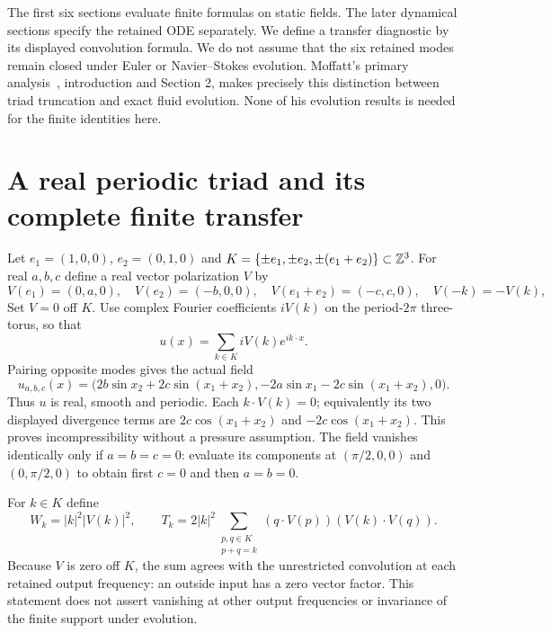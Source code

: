 \documentclass[11pt]{article}
\begin{document}
The first six sections evaluate finite formulas on static fields. The later dynamical sections specify the retained ODE separately. We define a transfer
diagnostic by its displayed convolution formula. We do not assume that
the six retained modes remain closed under Euler or Navier--Stokes
evolution. Moffatt's primary analysis~\cite{moffatt}, introduction and
Section 2, makes precisely this distinction between triad truncation and
exact fluid evolution. None of his evolution results is needed for the
finite identities here.

\section{A real periodic triad and its complete finite transfer}
Let $e_1=(1,0,0)$, $e_2=(0,1,0)$ and
$K=\{\pm e_1,\pm e_2,\pm(e_1+e_2)\}\subset\mathbb Z^3$.
For real $a,b,c$ define a real vector polarization $V$ by
\[
 V(e_1)=(0,a,0),\quad V(e_2)=(-b,0,0),\quad
 V(e_1+e_2)=(-c,c,0),\quad V(-k)=-V(k),
\]
Set $V=0$ off $K$. Use complex Fourier coefficients $iV(k)$ on
the period-$2\pi$ three-torus, so that
\[u(x)=\sum_{k\in K}iV(k)e^{ik\cdot x}.\] Pairing opposite modes gives the actual field
\begin{equation}\label{eq:velocity}
 u_{a,b,c}(x)=\bigl(2b\sin x_2+2c\sin(x_1+x_2),
           -2a\sin x_1-2c\sin(x_1+x_2),0\bigr).
\end{equation}
Thus $u$ is real, smooth and periodic. Each $k\cdot V(k)=0$;
equivalently its two displayed divergence terms are
$2c\cos(x_1+x_2)$ and $-2c\cos(x_1+x_2)$. This proves
incompressibility without a pressure assumption. The field vanishes
identically only if $a=b=c=0$: evaluate its components at
$(\pi/2,0,0)$ and $(0,\pi/2,0)$ to obtain first $c=0$ and then
$a=b=0$.

For $k\in K$ define
\begin{equation}\label{eq:weights-transfer}
 W_k=|k|^2|V(k)|^2,\qquad
 T_k=2|k|^2\sum_{\substack{p,q\in K\\p+q=k}}
       (q\cdot V(p))(V(k)\cdot V(q)).
\end{equation}
Because $V$ is zero off $K$, the sum agrees with the unrestricted
convolution at each retained output frequency: an outside input has a
zero vector factor. This statement does not assert vanishing at other
output frequencies or invariance of the finite support under evolution.
\end{document}
